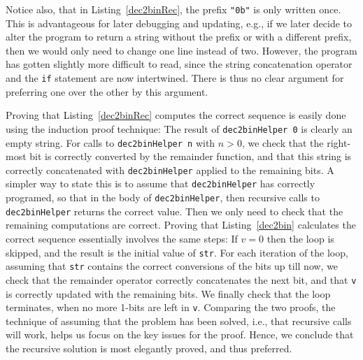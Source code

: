 Notice also, that in Listing~\ref{dec2binRec}, the prefix \lstinline!"0b"! is only written once. This is advantageous for later debugging and updating, e.g., if we later decide to alter the program to return a string without the prefix or with a different prefix, then we would only need to change one line instead of two. However, the program has gotten slightly more difficult to read, since the string concatenation operator and the \lstinline!if! statement are now intertwined. There is thus no clear argument for preferring one over the other by this argument.

Proving that Listing~\ref{dec2binRec} computes the correct sequence is easily done using the induction proof technique: The result of \lstinline!dec2binHelper 0! is clearly an empty string. For calls to \lstinline!dec2binHelper n! with $n>0$, we check that the right-most bit is correctly converted by the remainder function, and that this string is correctly concatenated with \lstinline!dec2binHelper! applied to the remaining bits. A simpler way to state this is to assume that \lstinline!dec2binHelper! has correctly programed, so that in the body of \lstinline!dec2binHelper!, then recursive calls to \lstinline!dec2binHelper! returns the correct value. Then we only need to check that the remaining computations are correct. Proving that Listing~\ref{dec2bin} calculates the correct sequence essentially involves the same steps: If $v = 0$ then the  loop is skipped, and the result is the initial value of \lstinline!str!. For each iteration of the  loop, assuming that \lstinline!str! contains the correct conversions of the bits up till now, we check that the remainder operator correctly concatenates the next bit, and that \lstinline!v! is correctly updated with the remaining bits. We finally check that the loop terminates, when no more 1-bits are left in \lstinline!v!. Comparing the two proofs, the technique of assuming that the problem has been solved, i.e., that recursive calls will work, helps us focus on the key issues for the proof. Hence, we conclude that the recursive solution is most elegantly proved, and thus preferred.



